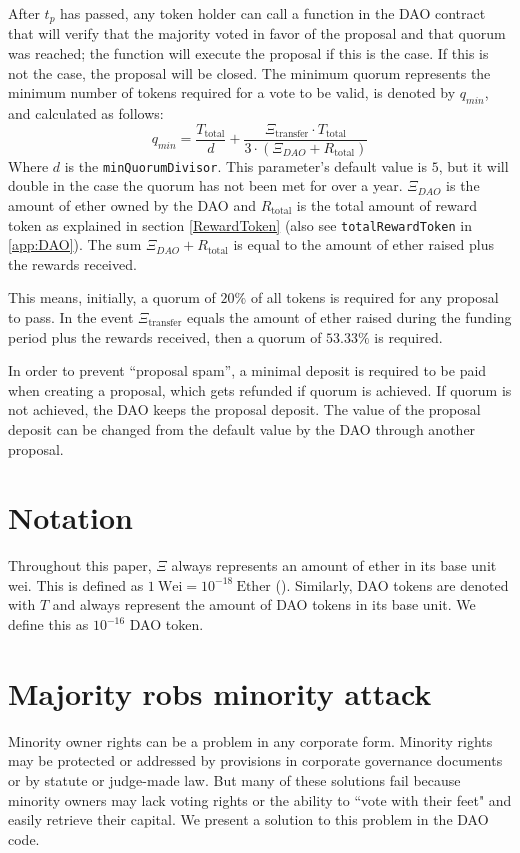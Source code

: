 \documentclass[9pt,oneside]{amsart}
\begin{document}
\begin{multicols}{2}
After $t_p$ has passed, any token holder can call a function in the DAO contract that will verify that the majority voted in favor of the proposal and that quorum was reached; the function will execute the proposal if this is the case. If this is not the case, the proposal will be closed. The minimum quorum represents the minimum number of tokens required for a vote to be valid, is denoted by $q_{min}$, and calculated as follows:
\begin{equation}
 q_{min} = \frac{T_{\text{total}}}{d} + \frac{\Xi_{\text{transfer}} \cdot T_{\text{total}}}{3 \cdot (\Xi_{DAO} + R_{\text{total}})}
 \label{minQuorum}
\end{equation}
Where $d$ is the \verb|minQuorumDivisor|. This parameter's default value is $5$, but it will double in the case the quorum has not been met for over a year.
$\Xi_{DAO}$ is the amount of ether owned by the DAO and $R_{\text{total}}$ is the total amount of reward token as explained in section \ref{RewardToken} (also see \verb|totalRewardToken| in \ref{app:DAO}). The sum $\Xi_{DAO} + R_{\text{total}}$ is equal to the amount of ether raised plus the rewards received.

This means, initially, a quorum of  $20\%$ of all tokens is required for any proposal to pass. In the event $\Xi_{\text{transfer}}$ equals the amount of ether raised during the funding period plus the rewards received, then a quorum of $53.33\%$ is required.

In order to prevent ``proposal spam'', a minimal deposit is required to be paid when creating a proposal, which gets refunded if quorum is achieved. If quorum is not achieved, the DAO keeps the proposal deposit. The value of the proposal deposit can be changed from the default value by the DAO through another proposal.

\section{Notation}
Throughout this paper, $\Xi$ always represents an amount of ether in its base unit wei. This is defined as $1 \: \text{Wei} = 10^{-18} \: \text{Ether}$ (\cite{Wood2014ethereum}).
Similarly, DAO tokens are denoted with $T$ and always represent the amount of DAO tokens in its base unit. We define this as $10^{-16}$ DAO token.
\section{Majority robs minority attack}
Minority owner rights can be a problem in any corporate form.  Minority rights may be protected or addressed by provisions in corporate governance documents or by statute or judge-made law.  But many of these solutions fail because minority owners may lack voting rights or the ability to ``vote with their feet" and easily retrieve their capital.  We present a solution to this problem in the DAO code.  


\end{multicols}
\end{document}
